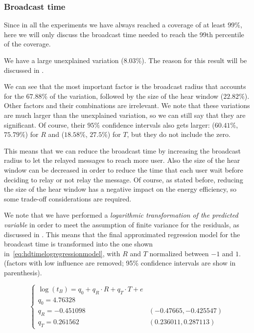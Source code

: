 \subsubsection{Broadcast time}\label{subsubsec:hd2krtime}

Since in all the experiments we have always reached a coverage of at least
\(99\%\), here we will only discuss the broadcast time needed to reach the 99th
percentile of the coverage.

We have a large unexplained variation (\(8.03\%\)). The reason for this result
will be discussed in .

We can see that the most important factor is the broadcast radius that accounts
for the \(67.88\%\) of the variation, followed by the size of the hear window
(\(22.82\%\)). Other factors and their combinations are irrelevant. We note that
these variations are much larger than the unexplained variation, so we can still
say that they are significant. Of course, their \(95\%\) confidence intervals
also gets larger: (\(60.41\%\), \(75.79\%\)) for \(R\) and (\(18.58\%\),
\(27.5\%\)) for \(T\), but they do not include the zero.

This means that we can reduce the broadcast time by increasing the broadcast
radius to let the relayed messages to reach more user. Also the size of the hear
window can be decreased in order to reduce the time that each user wait before
deciding to relay or not relay the message. Of course, as stated before,
reducing the size of the hear window has a negative impact on the energy
efficiency, so some trade-off considerations are required.

We note that we have performed a \emph{logarithmic transformation of the
predicted variable}  in order to meet the
assumption of finite variance for the residuals, as discussed in
. This means that the final approximated regression
model for the broadcast time is transformed into the one shown
in~\eqref{eq:hdtimelogregressionmodel}, with \(R\) and \(T\) normalized between
\(-1\) and \(1\). (factors with low influence are removed; 95\% confidence
intervals are show in parenthesis).

\begin{equation}\label{eq:hdtimelogregressionmodel}
	\begin{cases}
		\log(t_B) = q_0 + q_R \cdot R + q_T \cdot T + e\\
		q_0 = 4.76328\\
		q_R = -0.451098 & (-0.47665, -0.425547)\\
		q_T = 0.261562 & (0.236011, 0.287113)
	\end{cases}
\end{equation}

